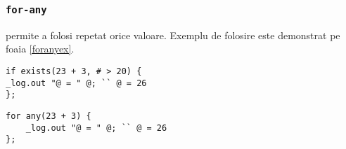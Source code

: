\subsubsection{\lstinline|for-any|}

 permite a folosi repetat orice valoare. Exemplu de folosire este demonstrat pe foaia \ref{foranyex}.

\begin{lstlisting}[caption=Folosirea if-exist-ului, label=ifexistsex]
if exists(23 + 3, # > 20) {
_log.out "@ = " @; `` @ = 26
};
\end{lstlisting}

\begin{lstlisting}[caption=Folosirea for-any-ului, label=foranyex]
for any(23 + 3) {
	_log.out "@ = " @; `` @ = 26
};
\end{lstlisting}
